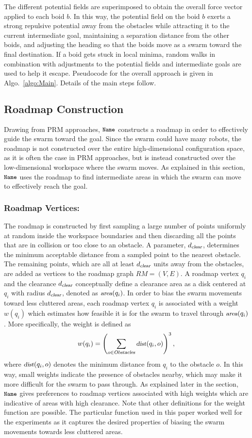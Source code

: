 \documentclass{llncs}
\newcommand{\Acronym}[1]{\ensuremath{{\small{\texttt{#1}}}}}
\newcommand{\Var}[1]{\ensuremath{{\small{\textsl{#1}}}}}
\newcommand{\Name}{\Acronym{Name}}
\begin{document}
The different potential fields are superimposed to obtain the overall
force vector applied to each boid $b$. In this way, the potential
field on the boid $b$ exerts a strong repulsive potential away from
the obstacles while attracting it to the current intermediate goal,
maintaining a separation distance from the other boids, and adjusting
the heading so that the boids move as a swarm toward the final
destination. If a boid gets stuck in local minima, random walks in
combination with adjustments to the potential fields and intermediate
goals are used to help it escape.  Pseudocode for the
overall approach is given in Algo.~\ref{algo:Main}. Details of the
main steps follow.

\subsection{Roadmap Construction}
\label{sec:RM}

Drawing from PRM \cite{PRM} approaches, $\Name$ constructs a roadmap
in order to effectively guide the swarm toward the goal. Since the
swarm could have many robots, the roadmap is not constructed over the
entire high-dimensional configuration space, as it is often the case
in PRM approaches, but is instead constructed over the low-dimensional
workspace where the swarm moves. As explained in this section, $\Name$
uses the roadmap to find intermediate areas in which the swarm can
move to effectively reach the goal.

\subsubsection{Roadmap Vertices:}
The roadmap is constructed by first sampling a large number of points
uniformly at random inside the workspace boundaries and then
discarding all the points that are in collision or too close to an
obstacle. A parameter, $d_\Var{clear}$, determines the minimum
acceptable distance from a sampled point to the nearest obstacle. The
remaining points, which are all at least $d_\Var{clear}$ units away
from the obstacles, are added as vertices to the roadmap graph $RM =
(V, E)$. A roadmap vertex $q_i$ and the clearance $d_\Var{clear}$
conceptually define a clearance area as a disk centered at $q_i$ with
radius $d_\Var{clear}$, denoted as $\Var{area}(q_i)$. In order to bias
the swarm movements toward less cluttered areas, each roadmap vertex
$q_i$ is associated with a weight $w(q_i)$ which estimates how
feasible it is for the swarm to travel through $\Var{area}(q_i)$. More
specifically, the weight is defined as
$$
w(q_i) = \left(\sum_{o \in \Var{Obstacles}} \Var{dist}(q_i, o)\right)^3,
$$ where $\Var{dist}(q_i, o)$ denotes the minimum distance from $q_i$
to the obstacle $o$. In this way, small weights indicate the presence
of obstacles nearby, which may make it more difficult for the swarm to
pass through.  As explained later in the section, $\Name$ gives
preferences to roadmap vertices associated with high weights which are
indicative of areas with high clearance. Note that other definitions
for the weight function are possible. The particular function used in
this paper worked well for the experiments as it captures the desired
properties of biasing the swarm movements towards less cluttered
areas.
\end{document}
